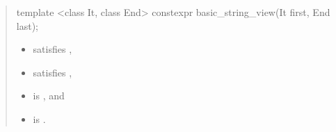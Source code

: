 \documentclass{wg21}
\begin{document}
\begin{quote}
\begin{addedblock}
%
%
% 
%
%
%
%



\begin{itemdecl}
template <class It, class End>
constexpr basic_string_view(It first, End last);

\end{itemdecl}

\begin{itemdescr}
    \constraints
    \begin{itemize}
        \item {} satisfies ,
        \item {} satisfies ,
        \item {} is , and
        \item {} is .
    \end{itemize}


\end{itemdescr}
\end{addedblock}
\end{quote}
\end{document}
